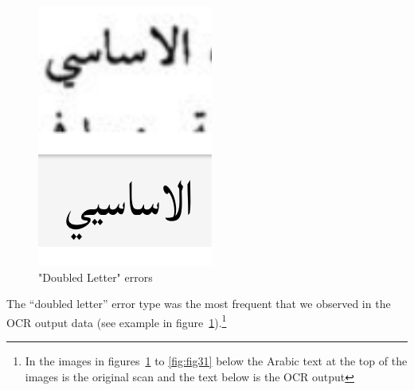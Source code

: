 \begin{figure}[h]
	\includegraphics[width=\linewidth]{images/image20.png}
	\caption{"Doubled Letter" errors}
	\label{fig:fig4}
\end{figure}

The “doubled letter” error type was the most frequent that we observed in the
OCR output data (see example in figure~\ref{fig:fig4}).\footnote{In the images
in figures~\ref{fig:fig4} to \ref{fig:fig31}  below the Arabic text at the top
of the images is the original scan and the text below is the OCR output}
                   
